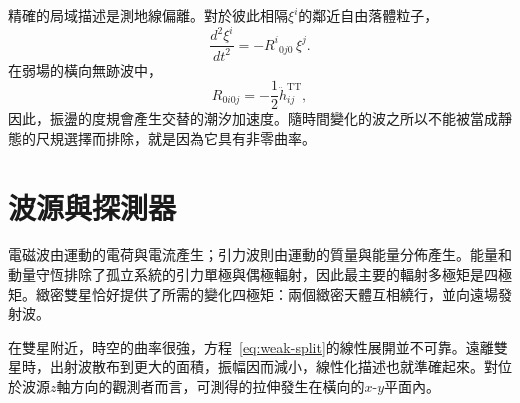 \begin{classroomqa}
\end{classroomqa}

精確的局域描述是測地線偏離。對於彼此相隔\(\xi^i\)的鄰近自由落體粒子，
\begin{equation}
 \frac{d^2\xi^i}{dt^2}
 =-R^i{}_{0j0}\,\xi^j.
 \label{eq:geodesic-deviation}
\end{equation}
在弱場的橫向無跡波中，
\begin{equation}
 R_{0i0j}=-\frac12\ddot h^{\mathrm{TT}}_{ij},
 \label{eq:tidal-curvature}
\end{equation}
因此，振盪的度規會產生交替的潮汐加速度。隨時間變化的波之所以不能被當成靜態的尺規選擇而排除，就是因為它具有非零曲率。

\begin{classroomqa}
\end{classroomqa}

\section{波源與探測器}

電磁波由運動的電荷與電流產生；引力波則由運動的質量與能量分佈產生。能量和動量守恆排除了孤立系統的引力單極與偶極輻射，因此最主要的輻射多極矩是四極矩。緻密雙星恰好提供了所需的變化四極矩：兩個緻密天體互相繞行，並向遠場發射波。

在雙星附近，時空的曲率很強，方程~\eqref{eq:weak-split}的線性展開並不可靠。遠離雙星時，出射波散布到更大的面積，振幅因而減小，線性化描述也就準確起來。對位於波源\(z\)軸方向的觀測者而言，可測得的拉伸發生在橫向的\(x\)-\(y\)平面內。

\begin{classroomqa}
\end{classroomqa}

